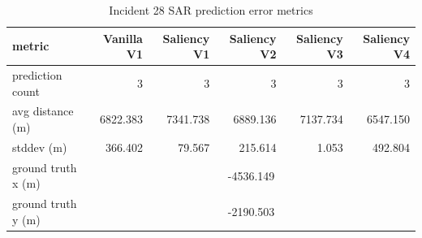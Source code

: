 \begin{table}[ht]
\centering
\caption{Incident 28 SAR prediction error metrics}
\label{tab:sar-incident-28}
\begin{tabular}{lrrrrr}
\hline
metric & Vanilla V1 & Saliency V1 & Saliency V2 & Saliency V3 & Saliency V4 \\
\hline
prediction count & 3 & 3 & 3 & 3 & 3 \\
avg distance (m) & 6822.383 & 7341.738 & 6889.136 & 7137.734 & 6547.150 \\
stddev (m) & 366.402 & 79.567 & 215.614 & 1.053 & 492.804 \\
ground truth x (m) & \multicolumn{5}{c}{-4536.149} \\
ground truth y (m) & \multicolumn{5}{c}{-2190.503} \\
\hline
\end{tabular}
\end{table}
